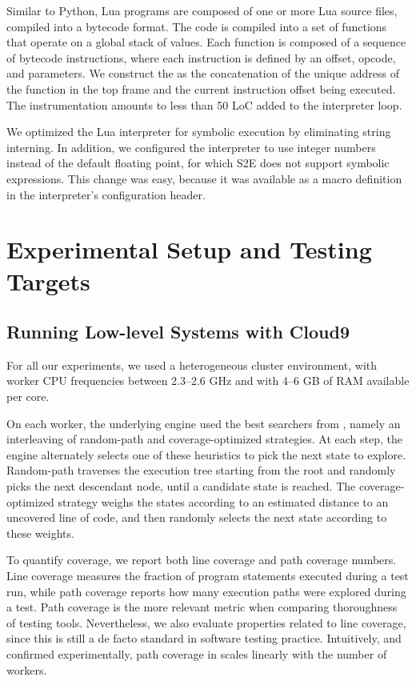Similar to Python, Lua programs are composed of one or more Lua source files, compiled into a bytecode format.  The code is compiled into a set of functions that operate on a global stack of values.  Each function is composed of a sequence of bytecode instructions, where each instruction is defined by an offset, opcode, and parameters.
%
We construct the \hlpc as the concatenation of the unique address of the function in the top frame and the current instruction offset being executed.  The instrumentation amounts to less than 50 LoC added to the interpreter loop.

We optimized the Lua interpreter for symbolic execution by eliminating string interning.  In addition, we configured the interpreter to use integer numbers instead of the default floating point, for which S2E does not support symbolic expressions.  This change was easy, because it was available as a macro definition in the interpreter's configuration header.


\section{Experimental Setup and Testing Targets}

\subsection{Running Low-level Systems with Cloud9}

For all our experiments, we used a heterogeneous cluster environment, with worker CPU frequencies between 2.3--2.6 GHz and with 4--6 GB of RAM available per core.

On each worker, the underlying \klee engine used the best searchers from \cite{klee}, namely an interleaving of random-path and coverage-optimized strategies. At each step, the engine alternately selects one of these heuristics to pick the next state to explore. Random-path traverses the execution tree starting from the root and randomly picks the next descendant node, until a candidate state is reached. The coverage-optimized strategy weighs the states according to an estimated distance to an uncovered line of code, and then randomly selects the next state according to these weights.

To quantify coverage, we report both line coverage and path coverage numbers. Line coverage measures the fraction of program statements executed during a test run, while path coverage reports how many execution paths were explored during a test. Path coverage is the more relevant metric when comparing thoroughness of testing tools.  Nevertheless, we also evaluate properties related to line coverage, since this is still a de facto standard in software testing practice. Intuitively, and confirmed experimentally, path coverage in \cnine scales linearly with the number of workers.

